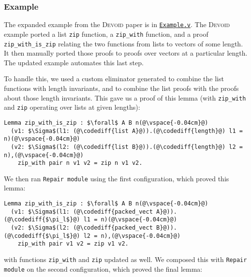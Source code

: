 
\subsubsection{Example}

The expanded example from the \textsc{Devoid} paper is in \href{https://github.com/uwplse/pumpkin-pi/blob/master/plugin/coq/examples/Example.v}{\lstinline{Example.v}}.
The \textsc{Devoid} example ported a list \lstinline{zip} function,
a \lstinline{zip_with} function, and a proof \lstinline{zip_with_is_zip} relating the two
functions from lists to vectors of some length.
It then manually ported those proofs to proofs over vectors at a particular length.
The updated \toolname example automates this last step.

To handle this, we used a custom eliminator \toolname generated to combine the list functions
with length invariants, and to combine the list proofs with the proofs about those length invariants.
This gave us a proof of this lemma (with \lstinline{zip_with} and \lstinline{zip} operating over lists at given lengths):

\begin{lstlisting}
Lemma zip_with_is_zip : $\forall$ A B n(@\vspace{-0.04cm}@)
  (v1: $\Sigma$(l1: (@\codediff{list A}@)).(@\codediff{length}@) l1 = n)(@\vspace{-0.04cm}@)
  (v2: $\Sigma$(l2: (@\codediff{list B}@)).(@\codediff{length}@) l2 = n),(@\vspace{-0.04cm}@)
    zip_with pair n v1 v2 = zip n v1 v2.
\end{lstlisting}
We then ran \lstinline{Repair module} using the first
configuration, which proved this lemma:

\begin{lstlisting}[backgroundcolor=\color{cyan!30}]
Lemma zip_with_is_zip : $\forall$ A B n(@\vspace{-0.04cm}@)
  (v1: $\Sigma$(l1: (@\codediff{packed_vect A}@)).(@\codediff{$\pi_l$}@) l1 = n)(@\vspace{-0.04cm}@)
  (v2: $\Sigma$(l2: (@\codediff{packed_vect B}@)).(@\codediff{$\pi_l$}@) l2 = n),(@\vspace{-0.04cm}@)
    zip_with pair v1 v2 = zip v1 v2.
\end{lstlisting}
with functions \lstinline{zip_with} and \lstinline{zip} updated as well.
We composed this with \lstinline{Repair module} on the second configuration,
which proved the final lemma:

